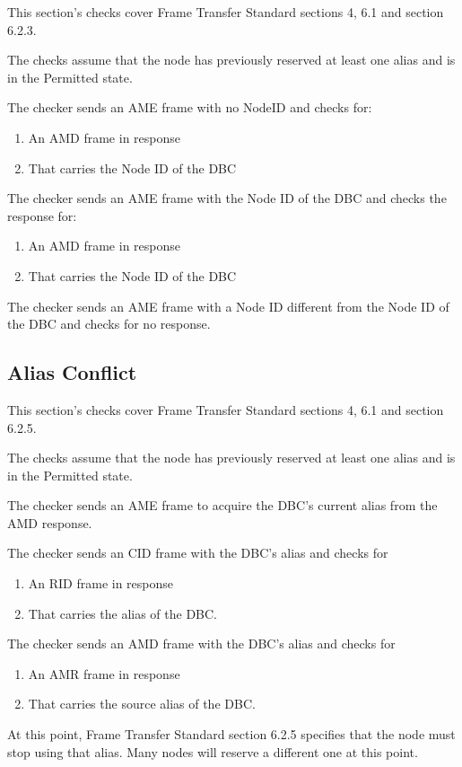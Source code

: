 This section's checks cover Frame Transfer Standard sections 4, 6.1 and section 6.2.3.

The checks assume that the node has previously reserved at least one alias
and is in the Permitted state.

The checker sends an AME frame with no NodeID and checks for:
\begin{enumerate}
\item An AMD frame in response
\item That carries the Node ID of the DBC
\end{enumerate}

The checker sends an AME frame with the Node ID of the DBC and checks the response for:
\begin{enumerate}
\item An AMD frame in response
\item That carries the Node ID of the DBC
\end{enumerate}

The checker sends an AME frame with a Node ID different from the Node ID of the DBC 
and checks for no response.


\subsection{Alias Conflict}

This section's checks cover Frame Transfer Standard sections 4, 6.1 and section 6.2.5.

The checks assume that the node has previously reserved at least one alias
and is in the Permitted state.

The checker sends an AME frame to acquire the DBC's current alias from the AMD
response.

The checker sends an CID frame with the DBC's alias and checks for
\begin{enumerate}
\item An RID frame in response
\item That carries the alias of the DBC.
\end{enumerate}

The checker sends an AMD frame with the DBC's alias and checks for
\begin{enumerate}
\item An AMR frame in response
\item That carries the source alias of the DBC.
\end{enumerate}

At this point, Frame Transfer Standard section 6.2.5 specifies that the node must stop
using that alias.  Many nodes will reserve a different one at this point.

